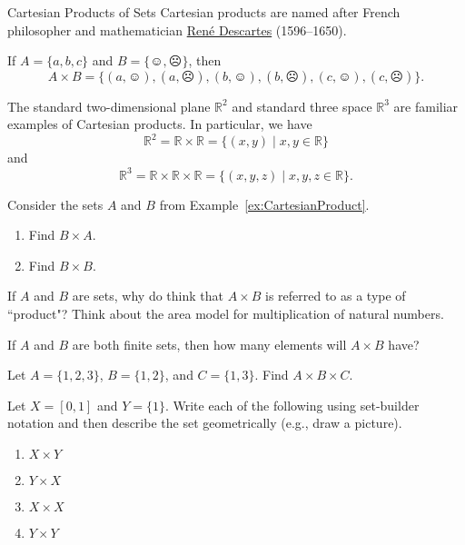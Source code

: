 \begin{section}{Cartesian Products of Sets}
Cartesian products are named after French philosopher and mathematician \href{https://en.wikipedia.org/wiki/Rene_Descartes}{Ren\'e Descartes} (1596--1650).

\begin{example}\label{ex:CartesianProduct}
If $A=\{a,b,c\}$ and $B=\{\smiley,\frownie\}$, then 
\[
A\times B=\{(a,\smiley), (a,\frownie),(b,\smiley),(b,\frownie), (c,\smiley),(c,\frownie)\}.
\]
\end{example}

\begin{example}
The standard two-dimensional plane $\mathbb{R}^2$ and standard three space $\mathbb{R}^{3}$ are familiar examples of Cartesian products.  In particular, we have
\[
\mathbb{R}^2=\mathbb{R}\times \mathbb{R}=\{(x,y)\mid x,y\in \mathbb{R}\}
\]
and
\[
\mathbb{R}^3=\mathbb{R}\times \mathbb{R}\times \mathbb{R}=\{(x,y,z)\mid x,y,z\in \mathbb{R}\}.
\]
\end{example}

\begin{problem}
Consider the sets $A$ and $B$ from Example~\ref{ex:CartesianProduct}.
\begin{enumerate}[label=\textrm{(\alph*)}]
\item Find $B\times A$. 
\item Find $B\times B$.
\end{enumerate}
\end{problem}

\begin{problem}
If $A$ and $B$ are sets, why do think that $A\times B$ is referred to as a type of ``product"? Think about the area model for multiplication of natural numbers.
\end{problem}

\begin{problem}
If $A$ and $B$ are both finite sets, then how many elements will $A\times B$ have?
\end{problem}

\begin{problem} 
Let $A=\{1, 2, 3\}$, $B=\{1,2\}$, and $C=\{1,3\}$. Find $A \times B\times C$. 
\end{problem}

\begin{problem}
Let $X=[0,1]$ and $Y=\{1\}$.  Write each of the following using set-builder notation and then describe the set geometrically (e.g., draw a picture). 
\begin{enumerate}[label=\textrm{(\alph*)}]
\item $X\times Y$
\item $Y\times X$
\item $X\times X$
\item $Y\times Y$
\end{enumerate}
\end{problem}


\end{section}

